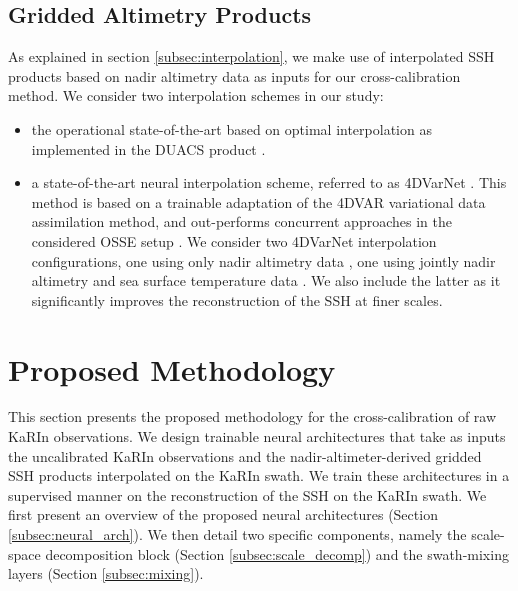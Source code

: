 \begin{bibunit}
\subsection{Gridded Altimetry Products}
\label{subsec:mapping}
\noindent
As explained in section \ref{subsec:interpolation}, we make use of interpolated SSH products based on
nadir altimetry data as inputs for our cross-calibration method.
We consider two interpolation schemes in our study:
\begin{itemize}
    \item the operational state-of-the-art based on optimal interpolation as implemented in the DUACS product \cite{taburet_duacs_2019}.
    \item a state-of-the-art neural interpolation scheme, referred to as 4DVarNet \cite{fablet_joint_2021}. This method is based on a trainable adaptation of the 4DVAR \cite{carrassi_data_2018} variational data assimilation method, and out-performs concurrent approaches in the considered OSSE setup \cite{osse_data_challenge}. We consider two 4DVarNet interpolation configurations, one using only nadir altimetry data \cite{Beauchamp_Febvre_Georgenthum_Fablet_2022}, one using jointly nadir altimetry and sea surface temperature data \cite{Fablet_Febvre_Chapron_2022}. We also include the latter as it significantly improves the reconstruction of the SSH at finer scales.
    
\end{itemize}

\section{Proposed Methodology}
\label{sec:method}
\noindent


This section presents the proposed methodology for the cross-calibration of raw KaRIn observations.
We design trainable neural architectures that take as inputs the uncalibrated KaRIn observations and the nadir-altimeter-derived gridded SSH products interpolated on the KaRIn swath. We train these architectures in a supervised manner on the reconstruction of the SSH on the KaRIn swath.
We first present an overview of the proposed neural architectures (Section \ref{subsec:neural_arch}). We then detail two specific components, namely the  scale-space decomposition block (Section \ref{subsec:scale_decomp}) and the swath-mixing layers (Section \ref{subsec:mixing}).


\end{bibunit}
